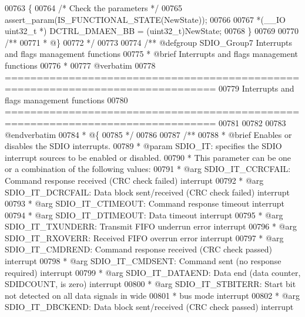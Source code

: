 \begin{DoxyCode}
00763 \{
00764   \textcolor{comment}{/* Check the parameters */}
00765   assert_param(IS\_FUNCTIONAL\_STATE(NewState));
00766 
00767   *(\_\_IO uint32\_t *) DCTRL_DMAEN_BB = (uint32\_t)NewState;
00768 \}
00769 
00770 \textcolor{comment}{/**}
00771 \textcolor{comment}{  * @\}}
00772 \textcolor{comment}{  */}
00773 
00774 \textcolor{comment}{/** @defgroup SDIO\_Group7 Interrupts and flags management functions}
00775 \textcolor{comment}{ *  @brief   Interrupts and flags management functions  }
00776 \textcolor{comment}{ *}
00777 \textcolor{comment}{@verbatim   }
00778 \textcolor{comment}{ ===============================================================================}
00779 \textcolor{comment}{                       Interrupts and flags management functions}
00780 \textcolor{comment}{ ===============================================================================  }
00781 \textcolor{comment}{}
00782 \textcolor{comment}{}
00783 \textcolor{comment}{@endverbatim}
00784 \textcolor{comment}{  * @\{}
00785 \textcolor{comment}{  */}
00786 
00787 \textcolor{comment}{/**}
00788 \textcolor{comment}{  * @brief  Enables or disables the SDIO interrupts.}
00789 \textcolor{comment}{  * @param  SDIO\_IT: specifies the SDIO interrupt sources to be enabled or disabled.}
00790 \textcolor{comment}{  *          This parameter can be one or a combination of the following values:}
00791 \textcolor{comment}{  *            @arg SDIO\_IT\_CCRCFAIL: Command response received (CRC check failed) interrupt}
00792 \textcolor{comment}{  *            @arg SDIO\_IT\_DCRCFAIL: Data block sent/received (CRC check failed) interrupt}
00793 \textcolor{comment}{  *            @arg SDIO\_IT\_CTIMEOUT: Command response timeout interrupt}
00794 \textcolor{comment}{  *            @arg SDIO\_IT\_DTIMEOUT: Data timeout interrupt}
00795 \textcolor{comment}{  *            @arg SDIO\_IT\_TXUNDERR: Transmit FIFO underrun error interrupt}
00796 \textcolor{comment}{  *            @arg SDIO\_IT\_RXOVERR:  Received FIFO overrun error interrupt}
00797 \textcolor{comment}{  *            @arg SDIO\_IT\_CMDREND:  Command response received (CRC check passed) interrupt}
00798 \textcolor{comment}{  *            @arg SDIO\_IT\_CMDSENT:  Command sent (no response required) interrupt}
00799 \textcolor{comment}{  *            @arg SDIO\_IT\_DATAEND:  Data end (data counter, SDIDCOUNT, is zero) interrupt}
00800 \textcolor{comment}{  *            @arg SDIO\_IT\_STBITERR: Start bit not detected on all data signals in wide }
00801 \textcolor{comment}{  *                                   bus mode interrupt}
00802 \textcolor{comment}{  *            @arg SDIO\_IT\_DBCKEND:  Data block sent/received (CRC check passed) interrupt}

\end{DoxyCode}
